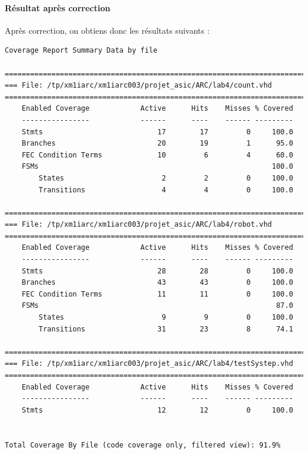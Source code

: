 \documentclass{article}
\begin{document}
\paragraph{Résultat après correction}
Après correction, on obtiens donc les résultats suivants :
\begin{verbatim}
Coverage Report Summary Data by file

=================================================================================
=== File: /tp/xm1iarc/xm1iarc003/projet_asic/ARC/lab4/count.vhd
=================================================================================
    Enabled Coverage            Active      Hits    Misses % Covered
    ----------------            ------      ----    ------ ---------
    Stmts                           17        17         0     100.0
    Branches                        20        19         1      95.0
    FEC Condition Terms             10         6         4      60.0
    FSMs                                                       100.0
        States                       2         2         0     100.0
        Transitions                  4         4         0     100.0

=================================================================================
=== File: /tp/xm1iarc/xm1iarc003/projet_asic/ARC/lab4/robot.vhd
=================================================================================
    Enabled Coverage            Active      Hits    Misses % Covered
    ----------------            ------      ----    ------ ---------
    Stmts                           28        28         0     100.0
    Branches                        43        43         0     100.0
    FEC Condition Terms             11        11         0     100.0
    FSMs                                                        87.0
        States                       9         9         0     100.0
        Transitions                 31        23         8      74.1

=================================================================================
=== File: /tp/xm1iarc/xm1iarc003/projet_asic/ARC/lab4/testSystep.vhd
=================================================================================
    Enabled Coverage            Active      Hits    Misses % Covered
    ----------------            ------      ----    ------ ---------
    Stmts                           12        12         0     100.0


Total Coverage By File (code coverage only, filtered view): 91.9%

\end{verbatim}
\end{document}
